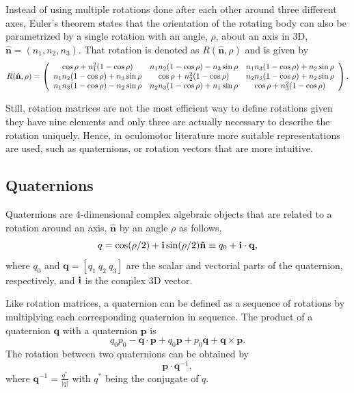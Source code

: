 Instead of using multiple rotations done after each other around three different axes, Euler's theorem states that the orientation of the rotating body can also be parametrized by a single rotation with an angle, $\rho$, about an axis in 3D, $\hat{\mathbf{n}} = (n_1, n_2, n_3)$. That rotation is denoted as $R(\hat{\mathbf{n}}, \rho)$ and is given by 
\begin{equation}
R ( \hat { \mathbf{n} } , \rho ) = \left( \begin{array} { c c c } { \cos \rho + n _ { 1 } ^ { 2 } ( 1 - \cos \rho ) } & { n _ { 1 } n _ { 2 } ( 1 - \cos \rho ) - n _ { 3 } \sin \rho } & { n _ { 1 } n _ { 3 } ( 1 - \cos \rho ) + n _ { 2 } \sin \rho } \\ { n _ { 1 } n _ { 2 } ( 1 - \cos \rho ) + n _ { 3 } \sin \rho } & { \cos \rho + n _ { 2 } ^ { 2 } ( 1 - \cos \rho ) } & { n _ { 2 } n _ { 3 } ( 1 - \cos \rho ) + n _ { 2 } \sin \rho } \\ { n _ { 1 } n _ { 3 } ( 1 - \cos \rho ) - n _ { 2 } \sin \rho } & { n _ { 2 } n _ { 3 } ( 1 - \cos \rho ) + n _ { 1 } \sin \rho } & { \cos \rho + n _ { 3 } ^ { 2 } ( 1 - \cos \rho ) } \end{array} \right).
\end{equation}

Still, rotation matrices are not the most efficient way to define rotations given they have nine elements and only three are actually necessary to describe the rotation uniquely. Hence, in oculomotor literature more suitable representations are used, such as quaternions, or rotation vectors that are more intuitive. \cite{rep}\cite{mathrot}

\subsection{Quaternions}
\label{cha2:represent:quat}
Quaternions are 4-dimensional complex algebraic objects that are related to a rotation around an axis, $\hat{ \mathbf{n}}$ by an angle $\rho$ as follows,
\begin{equation}
\label{sec2:eq:q}
q = \cos ( \rho / 2 ) + \mathbf{i} \sin ( \rho / 2 ) \mathbf{\hat{n}} \equiv q _ { 0 } + {\bf i}\cdot  {\bf q},
\end{equation}
where $q_0$ and $\mathbf{q} = [q_1 \ q_2 \ q_3]$ are the scalar and vectorial parts of the quaternion, respectively, and ${\bf i}$ is the complex 3D vector. 

Like rotation matrices, a quaternion can be defined as a sequence of rotations by multiplying each corresponding quaternion in sequence.
The product of a quaternion $\mathbf{q}$ with a quaternion $\mathbf{p}$ is 
\begin{equation}
	q_0 p_0 - \mathbf{q} \cdot \mathbf{p} + q_0 \mathbf{p} + p_0 \mathbf{q} + \mathbf{q} \times \mathbf{p}.
\end{equation}
The rotation between two quaternions can be obtained by 
\begin{equation}
\label{inrefiorenf}
\mathbf{p} \cdot \mathbf{q}^{-1},
\end{equation}
where $\mathbf{q}^{-1} = \frac{q^*}{|q|}$ with $q^*$ being the conjugate of $q$.

